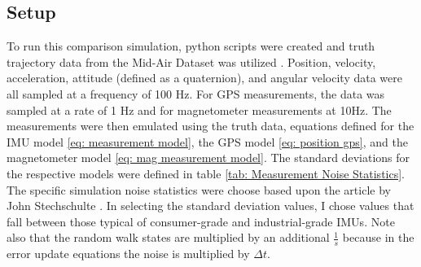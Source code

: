 \subsection{Setup}
To run this comparison simulation, python scripts were created and truth trajectory data from the Mid-Air Dataset was utilized \cite{Fonder2019MidAir}.  Position, velocity, acceleration, attitude (defined as a quaternion), and angular velocity data were all sampled at a frequency of 100 Hz. For GPS measurements, the data was sampled at a rate of 1 Hz and for magnetometer measurements at 10Hz. The measurements were then emulated using the truth data, equations defined for the IMU model \eqref{eq: measurement model}, the GPS model \eqref{eq: position gps}, and the magnetometer model \eqref{eq: mag measurement model}. The standard deviations for the respective models were defined in table \eqref{tab: Measurement Noise Statistics}. The specific simulation noise statistics were choose based upon the article by John Stechschulte \cite{stechschulte2023imuspecs}. In selecting the standard deviation values, I chose values that fall between those typical of consumer-grade and industrial-grade IMUs. Note also that the random walk states are multiplied by an additional $\frac{1}{s}$ because in the error update equations the noise is multiplied by $\Delta t$.

